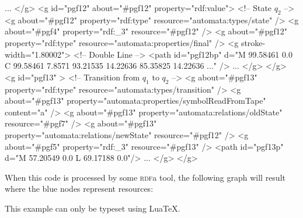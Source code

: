 \begin{codeexample}[multipage]
    ...
  </g>
  <g id="pgf12"  about="#pgf12" property="rdf:value">
    <!-- State $q_2$ -->
    <g about="#pgf12" property="rdf:type" resource="automata:types/state" />
    <g about="#pgf4" property="rdf:_3" resource="#pgf12" />
    <g about="#pgf12" property="rdf:type" resource="automata:properties/final" />
    <g stroke-width="1.80002">     <!-- Double Line -->
      <path id="pgf12bp" d="M 99.58461 0.0 C 99.58461 7.8571 93.21535 14.22636 85.35825 14.22636 ..." />
      ...
    </g>
  </g>
  <g id="pgf13" >
    <!-- Transition from $q_1$ to $q_2$ -->
    <g about="#pgf13" property="rdf:type" resource="automata:types/transition" />
    <g about="#pgf13" property="automata:properties/symbolReadFromTape" content="a" />
    <g about="#pgf13" property="automata:relations/oldState" resource="#pgf7" />
    <g about="#pgf13" property="automata:relations/newState" resource="#pgf12" />
    <g about="#pgf5" property="rdf:_3" resource="#pgf13" />
    <path id="pgf13p" d="M 57.20549 0.0 L 69.17188 0.0"/>
    ...
  </g>
</g>
\end{codeexample}

When this code is processed by some \textsc{rdf}a tool, the following graph
will result where the blue nodes represent resources:

\ifluatex
\else
    This example can only be typeset using Lua\TeX.
    \endgroup\expandafter\endinput
\fi

